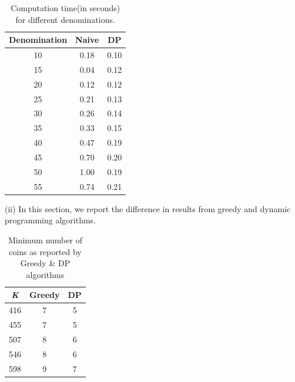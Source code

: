 \documentclass[assign]{article}
\begin{document}
 \begin{table}[!hbt]
   \caption{Computation time(in seconds) for different denominations.}
   \vspace{-10pt}
   \begin{center}
    \begin{tabular}{| c | c | c |}
      \hline
       Denomination & Naive & DP \\
      \hline
       10 & 0.18 & 0.10 \\
      \hline
       15 & 0.04 & 0.12 \\ 
      \hline
       20 & 0.12 & 0.12 \\
      \hline
       25 & 0.21 & 0.13 \\ 
       \hline
       30 & 0.26 & 0.14 \\
      \hline
       35 & 0.33 & 0.15 \\ 
       \hline
       40 & 0.47 & 0.19 \\
      \hline
       45 & 0.70 & 0.20 \\ 
      \hline
       50 & 1.00 & 0.19 \\
      \hline
       55 & 0.74 & 0.21 \\
      \hline
    \end{tabular}       
   \end{center}
   \label{tab1}
\end{table}  

(ii) In this section, we report the difference in results from greedy and dynamic programming algorithms.

\begin{table}[!hbt]
  \caption{Minimum number of coins as reported by Greedy \& DP algorithms}
\vspace{-10pt}
  \begin{center}
    \begin{tabular}{| c | c | c |}
       \hline
       {\emph K} & Greedy & DP \\
       \hline
       416 & 7 & 5 \\
       \hline
       455 & 7 & 5 \\
       \hline 
       507 & 8 & 6 \\
       \hline 
       546 & 8 & 6 \\
       \hline 
       598 & 9 & 7 \\
       \hline
    \end{tabular}
  \end{center}
  \label{tab2}
\end{table}
\end{document}
